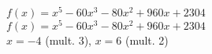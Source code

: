 {$f(x) = x^{5} - 60x^{3} - 80x^{2} + 960x + 2304$}
{$f(x) = x^{5} - 60x^{3} - 80x^{2} + 960x + 2304 $ \\ $x = -4$ (mult. 3), $x = 6$ (mult. 2)}
